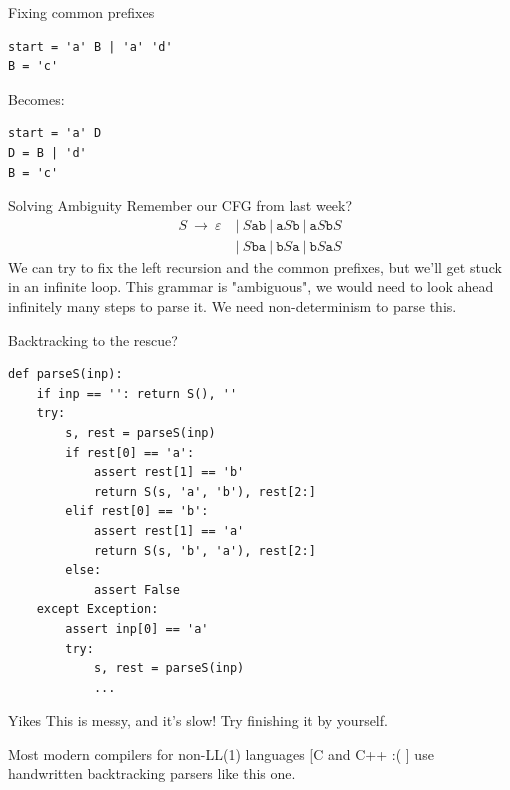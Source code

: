 \documentclass[aspectratio=169]{beamer}
\begin{document}
\begin{frame}[fragile]{Fixing common prefixes}
\begin{verbatim}
start = 'a' B | 'a' 'd'
B = 'c'
\end{verbatim} 
\pause 
Becomes:

\begin{verbatim}
start = 'a' D
D = B | 'd'
B = 'c'
\end{verbatim} 

\end{frame}

\begin{frame}{Solving Ambiguity}
    Remember our CFG from last week? 
    {
    \Large
    \begin{align*}
        S ~\to~ \varepsilon ~&|~ S\texttt{a}\texttt{b} ~|~ \texttt{a}S\texttt{b} ~|~ \texttt{a}S\texttt{b}S  \\
          ~&|~ S\texttt{b}\texttt{a} ~|~ \texttt{b}S\texttt{a} ~|~ \texttt{b}S\texttt{a}S
    \end{align*}
    }
We can try to fix the left recursion and the common prefixes, but we'll get stuck in an infinite loop. This grammar is "ambiguous", we would need to look ahead infinitely many steps to parse it. We need non-determinism to parse this. 
\end{frame}

\begin{frame}[fragile]{Backtracking to the rescue?}
\begin{verbatim}
def parseS(inp):
    if inp == '': return S(), '' 
    try:
        s, rest = parseS(inp)
        if rest[0] == 'a':
            assert rest[1] == 'b'
            return S(s, 'a', 'b'), rest[2:]
        elif rest[0] == 'b':
            assert rest[1] == 'a'
            return S(s, 'b', 'a'), rest[2:]
        else:
            assert False
    except Exception:
        assert inp[0] == 'a'
        try: 
            s, rest = parseS(inp)
            ...
\end{verbatim}
\end{frame}

\begin{frame}{Yikes}
     This is messy, and it's slow! Try finishing it by yourself.

    Most modern compilers for non-LL(1) languages [C and C++ :( ] use handwritten backtracking parsers like this one. 
\end{frame}
\end{document}
